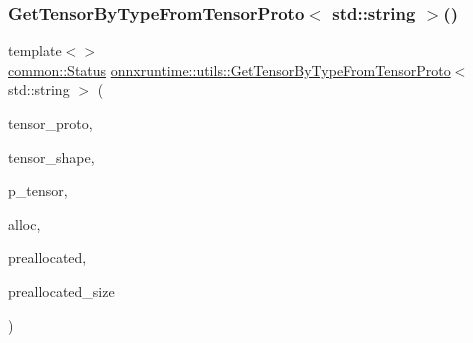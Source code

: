 \subsubsection{\texorpdfstring{Get\+Tensor\+By\+Type\+From\+Tensor\+Proto$<$ std\+::string $>$()}{GetTensorByTypeFromTensorProto< std::string >()}}
{\footnotesize\ttfamily template$<$$>$ \\
\mbox{\hyperlink{classonnxruntime_1_1common_1_1Status}{common\+::\+Status}} \mbox{\hyperlink{namespaceonnxruntime_1_1utils_a4b262f6da83860e920ce90279a3fb400}{onnxruntime\+::utils\+::\+Get\+Tensor\+By\+Type\+From\+Tensor\+Proto}}$<$ std\+::string $>$ (\begin{DoxyParamCaption}\item[{const Tensor\+Proto \&}]{tensor\+\_\+proto,  }\item[{const \mbox{\hyperlink{classonnxruntime_1_1TensorShape}{Tensor\+Shape}} \&}]{tensor\+\_\+shape,  }\item[{std\+::unique\+\_\+ptr$<$ \mbox{\hyperlink{classonnxruntime_1_1Tensor}{Tensor}} $>$ $\ast$}]{p\+\_\+tensor,  }\item[{\mbox{\hyperlink{namespaceonnxruntime_a6cdac724c5dcefded3a63f08dae58fda}{Allocator\+Ptr}}}]{alloc,  }\item[{\mbox{\hyperlink{mlasi_8h_a88f941d423cb2a819b70a1358982b1a6}{void}} $\ast$}]{preallocated,  }\item[{\mbox{\hyperlink{mlasi_8h_a503efbc1c6e50825320ad909366b78ab}{size\+\_\+t}}}]{preallocated\+\_\+size }\end{DoxyParamCaption})}

\mbox{\label{namespaceonnxruntime_1_1utils_a39b6f54f084a54bef83148d27bc50e30}} 
